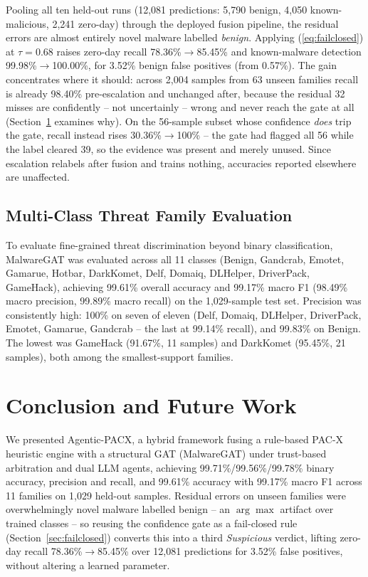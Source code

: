 \documentclass[conference]{IEEEtran}
\newcommand{\TestCount}{1,029}      %
\newcommand{\MulticlassAcc}{99.61\%}    %
\newcommand{\MulticlassMacroF}{99.17\%}     %
\newcommand{\MulticlassMacroP}{98.49\%} %
\newcommand{\MulticlassMacroR}{99.89\%} %
\newcommand{\BinaryAcc}{99.71\%}   %
\newcommand{\BinaryPrec}{99.56\%}  %
\newcommand{\BinaryRec}{99.78\%}   %
\newcommand{\BenignPrec}{99.83\%}    %
\newcommand{\GandcrabRec}{99.14\%}   %
\newcommand{\GameHackPrec}{91.67\%}  %
\newcommand{\GameHackN}{11}          %
\newcommand{\DarkKometPrec}{95.45\%} %
\newcommand{\DarkKometN}{21}         %
\newcommand{\GateTau}{0.68}
\newcommand{\EscBenignN}{5,790}
\newcommand{\EscKnownMalN}{4,050}
\newcommand{\EscZeroDayN}{2,241}
\newcommand{\EscTotalN}{12,081}
\newcommand{\EscZDBefore}{78.36\%}   %
\newcommand{\EscZDAfter}{85.45\%}    %
\newcommand{\EscKnownBefore}{99.98\%}
\newcommand{\EscKnownAfter}{100.00\%}
\newcommand{\EscFPBefore}{0.57\%}    %
\newcommand{\EscFPAfter}{3.52\%}     %
\newcommand{\NovelN}{2,004}
\newcommand{\NovelFamilies}{63}
\newcommand{\NovelBefore}{98.40\%}
\newcommand{\NovelMissN}{32}
\newcommand{\HardN}{56}
\newcommand{\HardBefore}{30.36\%}
\newcommand{\HardAfter}{100\%}
\begin{document}
Pooling all ten held-out runs (\EscTotalN{} predictions: \EscBenignN{} benign, \EscKnownMalN{} known-malicious, \EscZeroDayN{} zero-day) through the deployed fusion pipeline, the residual errors are almost entirely novel malware labelled \emph{benign}. Applying (\ref{eq:failclosed}) at $\tau = \GateTau$ raises zero-day recall \EscZDBefore{}$\rightarrow$\EscZDAfter{} and known-malware detection \EscKnownBefore{}$\rightarrow$\EscKnownAfter{}, for \EscFPAfter{} benign false positives (from \EscFPBefore{}). The gain concentrates where it should: across \NovelN{} samples from \NovelFamilies{} unseen families recall is already \NovelBefore{} pre-escalation and unchanged after, because the residual \NovelMissN{} misses are confidently -- not uncertainly -- wrong and never reach the gate at all (Section~\ref{sec:conclusion} examines why). On the \HardN{}-sample subset whose confidence \emph{does} trip the gate, recall instead rises \HardBefore{}$\rightarrow$\HardAfter{} -- the gate had flagged all \HardN{} while the label cleared 39, so the evidence was present and merely unused. Since escalation relabels after fusion and trains nothing, accuracies reported elsewhere are unaffected.

\subsection{Multi-Class Threat Family Evaluation}
To evaluate fine-grained threat discrimination beyond binary classification, MalwareGAT was evaluated across all 11 classes (Benign, Gandcrab, Emotet, Gamarue, Hotbar, DarkKomet, Delf, Domaiq, DLHelper, DriverPack, GameHack), achieving \MulticlassAcc{} overall accuracy and \MulticlassMacroF{} macro F1 (\MulticlassMacroP{} macro precision, \MulticlassMacroR{} macro recall) on the \TestCount{}-sample test set. Precision was consistently high: 100\% on seven of eleven (Delf, Domaiq, DLHelper, DriverPack, Emotet, Gamarue, Gandcrab -- the last at \GandcrabRec{} recall), and \BenignPrec{} on Benign. The lowest was GameHack (\GameHackPrec{}, \GameHackN{} samples) and DarkKomet (\DarkKometPrec{}, \DarkKometN{} samples), both among the smallest-support families.

\section{Conclusion and Future Work}
\label{sec:conclusion}
We presented Agentic-PACX, a hybrid framework fusing a rule-based PAC-X heuristic engine with a structural GAT (MalwareGAT) under trust-based arbitration and dual LLM agents, achieving \BinaryAcc{}/\BinaryPrec{}/\BinaryRec{} binary accuracy, precision and recall, and \MulticlassAcc{} accuracy with \MulticlassMacroF{} macro F1 across 11 families on \TestCount{} held-out samples. Residual errors on unseen families were overwhelmingly novel malware labelled benign -- an $\arg\max$ artifact over trained classes -- so reusing the confidence gate as a fail-closed rule (Section~\ref{sec:failclosed}) converts this into a third \emph{Suspicious} verdict, lifting zero-day recall \EscZDBefore{}$\rightarrow$\EscZDAfter{} over \EscTotalN{} predictions for \EscFPAfter{} false positives, without altering a learned parameter.
\end{document}
